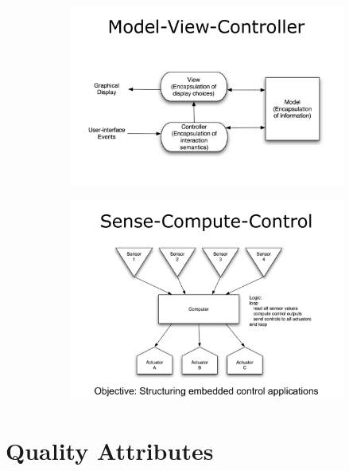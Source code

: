 \documentclass[a4paper]{article}
\begin{document}
\begin{figure}[H]
\hskip-2.5cm\begin{subfigure}{1.2\textwidth}
  \includegraphics[width=1.2\linewidth]
  {images/3-model-view-controller.png}
\end{subfigure}
\end{figure}


\begin{figure}[H]
\hskip-2.5cm\begin{subfigure}{1.2\textwidth}
  \includegraphics[width=1.2\linewidth]
  {images/3-sense-compute-control.png}
\end{subfigure}
\end{figure}

\section{Quality Attributes}
\end{document}
